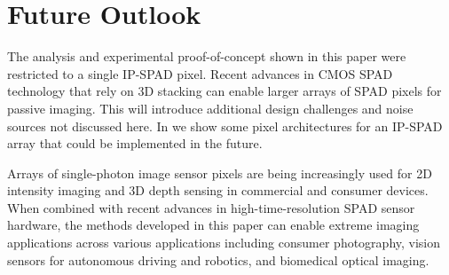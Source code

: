 \section{Future Outlook}
The analysis and experimental proof-of-concept shown in this paper were
restricted to a single IP-SPAD pixel. Recent advances in CMOS SPAD technology
that rely on 3D stacking \cite{Henderson_2019_ISSCC} can enable larger arrays
of SPAD pixels for passive imaging. This will introduce additional design
challenges and noise sources not discussed here. In
\nolink{\ref{suppl:pixel_designs}} we show some pixel architectures for an
IP-SPAD array that could be implemented in the future.

Arrays of single-photon image sensor pixels are being increasingly used for 2D
intensity imaging and 3D depth sensing
\cite{yoshida_2020,Lee_2020,Mardirosian_2020} in commercial and consumer
devices. When combined with recent advances in high-time-resolution SPAD sensor
hardware, the methods developed in this paper can enable extreme imaging
applications across various applications including consumer photography, vision
sensors for autonomous driving and robotics, and biomedical optical imaging.




